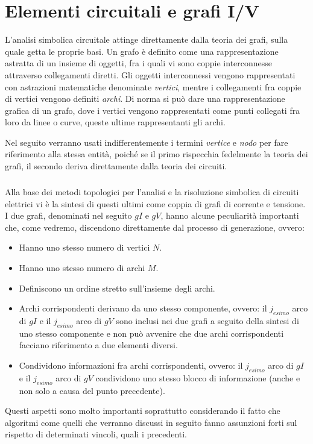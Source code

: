 \chapter{Elementi circuitali e grafi I/V}

L'analisi simbolica circuitale attinge direttamente dalla teoria dei grafi, sulla quale getta le proprie basi. Un grafo è definito come una rappresentazione astratta di un insieme di oggetti, fra i quali vi sono coppie interconnesse attraverso collegamenti diretti. Gli oggetti interconnessi vengono rappresentati con astrazioni matematiche denominate \textit{vertici}, mentre i collegamenti fra coppie di vertici vengono definiti \textit{archi}. Di norma si può dare una rappresentazione grafica di un grafo, dove i vertici vengono rappresentati come punti collegati fra loro da linee o curve, queste ultime rappresentanti gli archi.

Nel seguito verranno usati indifferentemente i termini \textit{vertice} e \textit{nodo} per fare riferimento alla stessa entità, poiché se il primo rispecchia fedelmente la teoria dei grafi, il secondo deriva direttamente dalla teoria dei circuiti.

\paragraph{}
Alla base dei metodi topologici per l'analisi e la risoluzione simbolica di circuiti elettrici vi è la sintesi di questi ultimi come coppia di grafi di corrente e tensione. I due grafi, denominati nel seguito $gI$ e $gV$, hanno alcune peculiarità importanti che, come vedremo, discendono direttamente dal processo di generazione, ovvero:
\begin{itemize}
 \item Hanno uno stesso numero di vertici $N$.
 \item Hanno uno stesso numero di archi $M$.
 \item Definiscono un ordine stretto sull'insieme degli archi.
 \item Archi corrispondenti derivano da uno stesso componente, ovvero: il $j_{esimo}$ arco di $gI$ e il $j_{esimo}$ arco di $gV$ sono inclusi nei due grafi a seguito della sintesi di uno stesso componente e non può avvenire che due archi corrispondenti facciano riferimento a due elementi diversi.
 \item Condividono informazioni fra archi corrispondenti, ovvero: il $j_{esimo}$ arco di $gI$ e il $j_{esimo}$ arco di $gV$ condividono uno stesso blocco di informazione (anche e non solo a causa del punto precedente).
\end{itemize}
Questi aspetti sono molto importanti soprattutto considerando il fatto che algoritmi come quelli che verranno discussi in seguito fanno assunzioni forti sul rispetto di determinati vincoli, quali i precedenti.

